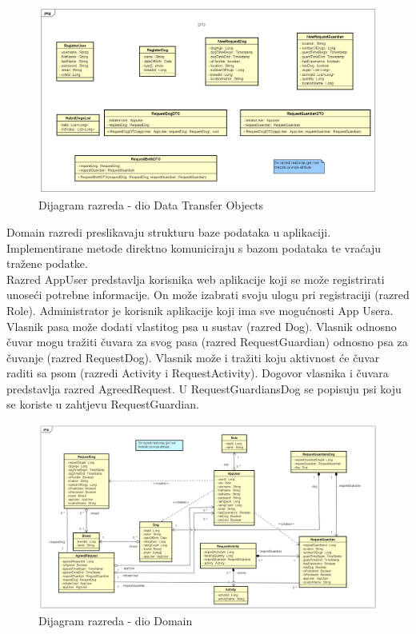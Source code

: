 			\begin{figure}[htb]
				\centering
				\includegraphics[width=16cm]{slike/class_diagrams_dtos}
				\caption{Dijagram razreda - dio Data Transfer Objects}
				\label{fig:Class-Diagram}
			\end{figure}
		
		
			Domain razredi preslikavaju strukturu baze podataka u aplikaciji. Implementirane metode direktno komuniciraju s bazom podataka te vraćaju tražene podatke.\\
			Razred AppUser predstavlja korisnika web aplikacije koji se može registrirati unoseći potrebne informacije. On može izabrati svoju ulogu pri registraciji (razred Role). Administrator je korisnik aplikacije koji ima sve mogućnosti App Usera. Vlasnik pasa može dodati vlastitog psa u sustav (razred Dog). Vlasnik odnosno čuvar mogu tražiti čuvara za svog pasa (razred RequestGuardian) odnosno psa za čuvanje (razred RequestDog). Vlasnik može i tražiti koju aktivnost će čuvar raditi sa psom (razredi Activity i RequestActivity). Dogovor vlasnika i čuvara predstavlja razred AgreedRequest. U RequestGuardiansDog se popisuju psi koju se koriste u zahtjevu RequestGuardian.
			
			\begin{figure}[htb]
				\centering
				\includegraphics[width=16cm]{slike/class_diagram_domain}
				\caption{Dijagram razreda - dio Domain}
				\label{fig:Class-Diagram}
			\end{figure}
	
